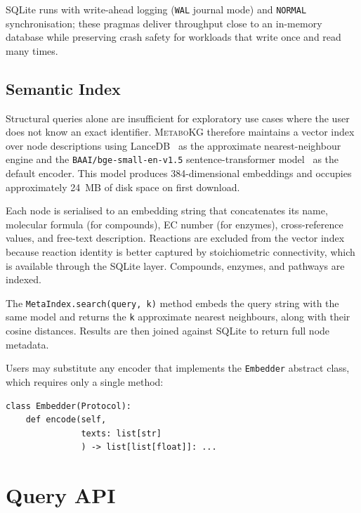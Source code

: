 \documentclass[10pt]{article}
\begin{document}
SQLite runs with write-ahead logging (\texttt{WAL} journal mode) and
\texttt{NORMAL} synchronisation; these pragmas deliver throughput close to an
in-memory database while preserving crash safety for workloads that write once
and read many times.

\subsection{Semantic Index}

Structural queries alone are insufficient for exploratory use cases where the
user does not know an exact identifier. \textsc{MetaboKG} therefore maintains a
vector index over node descriptions using LanceDB~\citep{lancedb2023} as the
approximate nearest-neighbour engine and the \texttt{BAAI/bge-small-en-v1.5}
sentence-transformer model~\citep{reimers2019sbert} as the default encoder.
This model produces 384-dimensional embeddings and occupies approximately
24~MB of disk space on first download.

Each node is serialised to an embedding string that concatenates its name,
molecular formula (for compounds), EC number (for enzymes), cross-reference
values, and free-text description. Reactions are excluded from the vector
index because reaction identity is better captured by stoichiometric
connectivity, which is available through the SQLite layer. Compounds, enzymes,
and pathways are indexed.

The \texttt{MetaIndex.search(query, k)} method embeds the query string with
the same model and returns the \texttt{k} approximate nearest neighbours,
along with their cosine distances. Results are then joined against SQLite to
return full node metadata.

Users may substitute any encoder that implements the \texttt{Embedder}
abstract class, which requires only a single method:

\begin{lstlisting}[style=python]
class Embedder(Protocol):
    def encode(self,
               texts: list[str]
               ) -> list[list[float]]: ...
\end{lstlisting}

\section{Query API}
\label{sec:query}
\end{document}
